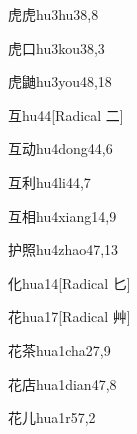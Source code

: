 \begin{verbete}{虎虎}{hu3hu3}{8,8}
\end{verbete}

\begin{verbete}{虎口}{hu3kou3}{8,3}
\end{verbete}

\begin{verbete}{虎鼬}{hu3you4}{8,18}
\end{verbete}

\begin{verbete}{互}{hu4}{4}[Radical ⼆]
\end{verbete}

\begin{verbete}{互动}{hu4dong4}{4,6}
\end{verbete}

\begin{verbete}{互利}{hu4li4}{4,7}
\end{verbete}

\begin{verbete}{互相}{hu4xiang1}{4,9}
\end{verbete}

\begin{verbete}{护照}{hu4zhao4}{7,13}
\end{verbete}

\begin{verbete}{化}{hua1}{4}[Radical 匕]
\end{verbete}

\begin{verbete}{花}{hua1}{7}[Radical 艸]
\end{verbete}

\begin{verbete}{花茶}{hua1cha2}{7,9}
\end{verbete}

\begin{verbete}{花店}{hua1dian4}{7,8}
\end{verbete}

\begin{verbete}{花儿}{hua1r5}{7,2}
\end{verbete}


